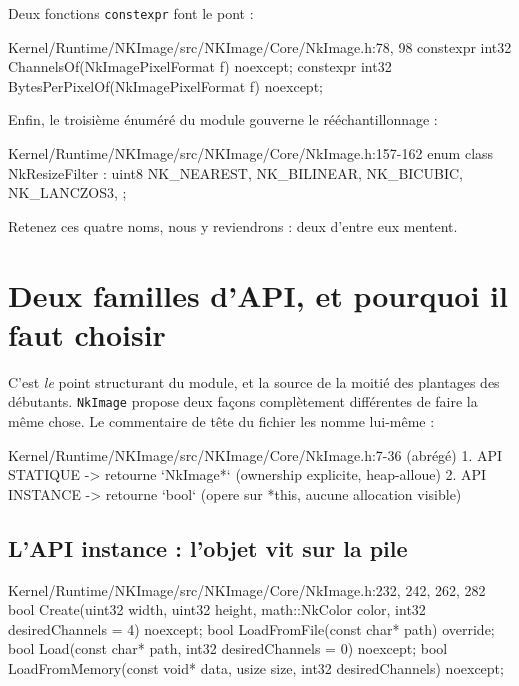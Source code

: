 Deux fonctions \texttt{constexpr} font le pont :

\begin{nkcode}{Kernel/Runtime/NKImage/src/NKImage/Core/NkImage.h:78, 98}
constexpr int32 ChannelsOf(NkImagePixelFormat f) noexcept;
constexpr int32 BytesPerPixelOf(NkImagePixelFormat f) noexcept;
\end{nkcode}

Enfin, le troisième énuméré du module gouverne le rééchantillonnage :

\begin{nkcode}{Kernel/Runtime/NKImage/src/NKImage/Core/NkImage.h:157-162}
enum class NkResizeFilter : uint8 {
    NK_NEAREST, NK_BILINEAR, NK_BICUBIC, NK_LANCZOS3,
};
\end{nkcode}

\noindent Retenez ces quatre noms, nous y reviendrons : deux d'entre eux
mentent.

\section{Deux familles d'API, et pourquoi il faut choisir}

C'est \emph{le} point structurant du module, et la source de la moitié des
plantages des débutants. \texttt{NkImage} propose deux façons complètement
différentes de faire la même chose. Le commentaire de tête du fichier les nomme
lui-même :

\begin{nkcode}{Kernel/Runtime/NKImage/src/NKImage/Core/NkImage.h:7-36 (abrégé)}
 1. API STATIQUE  -> retourne `NkImage*`  (ownership explicite, heap-alloue)
 2. API INSTANCE  -> retourne `bool`  (opere sur *this, aucune allocation visible)
\end{nkcode}

\subsection{L'API instance : l'objet vit sur la pile}

\begin{nkcode}{Kernel/Runtime/NKImage/src/NKImage/Core/NkImage.h:232, 242, 262, 282}
bool Create(uint32 width, uint32 height, math::NkColor color,
            int32 desiredChannels = 4) noexcept;
bool LoadFromFile(const char* path) override;
bool Load(const char* path, int32 desiredChannels = 0) noexcept;
bool LoadFromMemory(const void* data, usize size, int32 desiredChannels) noexcept;
\end{nkcode}

